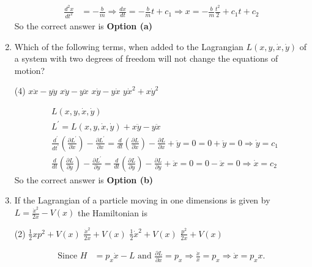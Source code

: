\begin{enumerate}
\begin{answer}
$$\begin{aligned}
	\frac{d^{2} x}{d t^{2}}&=-\frac{b}{m} \Rightarrow \frac{d x}{d t}=-\frac{b}{m} t+c_{1} \Rightarrow x=-\frac{b}{m} \frac{t^{2}}{2}+c_{1} t+c_{2}
\end{aligned}
$$
So the correct answer is \textbf{Option (a)}
\end{answer}
	\item Which of the following terms, when added to the Lagrangian $L(x, y, \dot{x}, \dot{y})$ of a system with two degrees of freedom will not change the equations of motion?
	{}
	 \begin{tasks}(4)
		\task[\textbf{a.}]$x \ddot{x}-y \ddot{y}$
		\task[\textbf{b.}]$x \ddot{y}-y \ddot{x}$
		\task[\textbf{c.}]$x \dot{y}-y \dot{x}$
		\task[\textbf{d.}] $y \dot{x}^{2}+x \dot{y}^{2}$
	\end{tasks}
	\begin{answer}
		$$
		\begin{aligned}
		&L(x, y, \dot{x}, \dot{y})\\
		&L^{\prime}=L(x, y, \dot{x}, \dot{y})+x \ddot{y}-y \ddot{x}\\
		&\frac{d^{\prime}}{d t^{\prime}}\left(\frac{\partial L^{\prime}}{\partial \dot{x}}\right)-\frac{\partial L^{\prime}}{\partial x}=\frac{d}{d t}\left(\frac{\partial L}{\partial \dot{x}}\right)-\frac{\partial L}{\partial x}+\ddot{y}=0=0+\ddot{y}=0 \Rightarrow \dot{y}=c_{1}\\
		&\frac{d}{d t}\left(\frac{\partial L}{\partial y}\right)-\frac{\partial L^{\prime}}{\partial y}=\frac{d}{d t}\left(\frac{\partial L}{\partial \dot{y}}\right)-\frac{\partial L}{\partial y}+\ddot{x}=0=0-\ddot{x}=0 \Rightarrow \dot{x}=c_{2}
	\end{aligned}
	$$
	So the correct answer is \textbf{Option (b)}
	\end{answer}
\item If the Lagrangian of a particle moving in one dimensions is given by $L=\frac{\dot{x}^{2}}{2 x}-V(x)$ the Hamiltonian is
{}
 \begin{tasks}(2)
	\task[\textbf{a.}]$\frac{1}{2} x p^{2}+V(x)$
	\task[\textbf{b.}] $\frac{\dot{x}^{2}}{2 x}+V(x)$
	\task[\textbf{c.}]$\frac{1}{2} \dot{x}^{2}+V(x)$
	\task[\textbf{d.}] $\frac{p^{2}}{2 x}+V(x)$
\end{tasks}
\begin{answer}
	$$
	\begin{aligned}
	\text { Since } H&=p_{x} \dot{x}-L \text { and } \frac{\partial L}{\partial \dot{x}}=p_{x} \Rightarrow \frac{\dot{x}}{x}=p_{x} \Rightarrow \dot{x}=p_{x} x \text {. }\\

\end{aligned}$$
\end{answer}
\end{enumerate}
